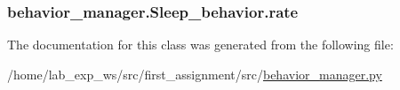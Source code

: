 \subsubsection[{\texorpdfstring{rate}{rate}}]{\setlength{\rightskip}{0pt plus 5cm}behavior\+\_\+manager.\+Sleep\+\_\+behavior.\+rate}\hypertarget{classbehavior__manager_1_1Sleep__behavior_a75cca73975838d3ee66cc687726685de}{}\label{classbehavior__manager_1_1Sleep__behavior_a75cca73975838d3ee66cc687726685de}


The documentation for this class was generated from the following file\+:\begin{DoxyCompactItemize}
\item 
/home/lab\+\_\+exp\+\_\+ws/src/first\+\_\+assignment/src/\hyperlink{behavior__manager_8py}{behavior\+\_\+manager.\+py}\end{DoxyCompactItemize}
